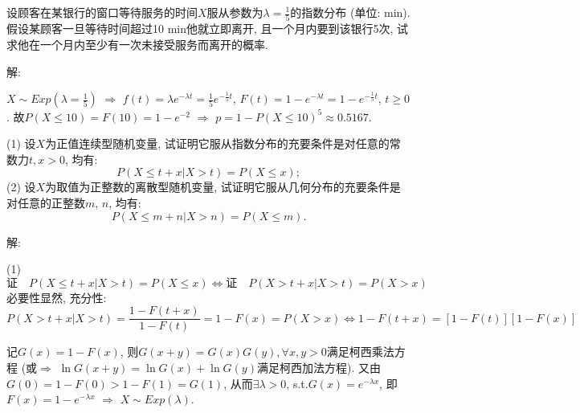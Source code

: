 \documentclass[standard]{ExBook}
\begin{document}
\begin{qitems}
\vspace{-5em}

    \begin{bbox}
    \begin{shaded}
        \qitem
设顾客在某银行的窗口等待服务的时间$X$服从参数为$\lambda=\displaystyle\frac{1}{5}$的指数分布 (单位: min). 假设某顾客一旦等待时间超过10 min他就立即离开, 且一个月内要到该银行5次, 试求他在一个月内至少有一次未接受服务而离开的概率.
    \end{shaded}
    \end{bbox}

\vspace{-5em}

    \begin{bbox}
解: 

$X\sim Exp(\lambda=\frac{1}{5})$ $\Longrightarrow$ $f(t)=\lambda e^{-\lambda t}=\frac{1}{5}e^{-\frac{1}{5}t}$, $F(t)=1-e^{-\lambda t}=1-e^{-\frac{1}{5}t}$, $t\geq 0$. 故$P(X \leq 10)=F(10)=1-e^{-2}$ $\Longrightarrow$ $p=1-P(X \leq 10)^5\approx0.5167$.
    \end{bbox}

\vspace{-5em}

    \begin{bbox}
    \begin{shaded}
        \qitem
(1) 设$X$为正值连续型随机变量, 试证明它服从指数分布的充要条件是对任意的常数力$t,x > 0$, 均有:
$$P(X \leq t+x|X>t)=P(X \leq x);$$
(2) 设$X$为取值为正整数的离散型随机变量, 试证明它服从几何分布的充要条件是对任意的正整数$m$, $n$, 均有:
$$P(X \leq m+n|X>n)=P(X \leq m).$$
    \end{shaded}
    \end{bbox}

\vspace{-5em}

    \begin{bbox}
解: 

(1)
$$\text{证}\quad P(X \leq t+x|X>t)=P(X \leq x) \Longleftrightarrow \text{证}\quad P(X > t+x|X>t)=P(X > x)$$
必要性显然, 充分性:
$$P(X > t+x|X>t)=\frac{1-F(t+x)}{1-F(t)}=1-F(x)=P(X>x) \Longleftrightarrow 1-F(t+x)=[1-F(t)][1-F(x)]$$
    \end{bbox}

\vspace{-5em}

    \begin{bbox}
记$G(x)=1-F(x)$, 则$G(x+y)=G(x)G(y),\forall x,y>0$满足柯西乘法方程 (或$\Longrightarrow$ $\ln G(x+y)=\ln G(x)+\ln G(y)$满足柯西加法方程). 又由$G(0)=1-F(0)>1-F(1)=G(1)$, 从而$\exists\lambda>0$, s.t.$G(x)=e^{-\lambda x}$, 即$F(x)=1-e^{-\lambda x}$ $\Longrightarrow$ $X\sim Exp(\lambda)$.


\end{bbox}
\end{qitems}
\end{document}
